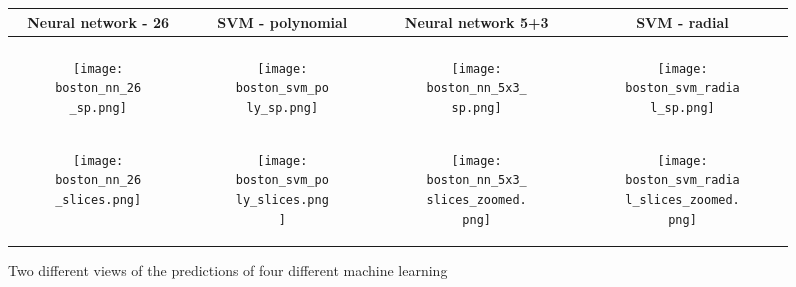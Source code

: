 \begin{figure*}[t]
  \centering
  \begin{tabular}[b]{cccc}
    Neural network - 26 & SVM - polynomial & Neural network 5+3 & SVM - radial \\
    \hline \\
    \begin{subfigure}[b]{0.2\textwidth}
      \texttt{[image: boston\_nn\_26\_sp.png]}
      \caption{
      }
      \label{fig:nn_comp:a}
    \end{subfigure}
    &
    \begin{subfigure}[b]{0.2\textwidth}
      \texttt{[image: boston\_svm\_poly\_sp.png]}
      \caption{
      }
      \label{fig:nn_comp:b}
    \end{subfigure}
    &
    \begin{subfigure}[b]{0.2\textwidth}
      \texttt{[image: boston\_nn\_5x3\_sp.png]}
      \caption{
      }
      \label{fig:nn_comp:c}
    \end{subfigure}
    &
    \begin{subfigure}[b]{0.2\textwidth}
      \texttt{[image: boston\_svm\_radial\_sp.png]}
      \caption{
      }
      \label{fig:nn_comp:d}
    \end{subfigure} \\
    \begin{subfigure}[b]{0.2\textwidth}
      \texttt{[image: boston\_nn\_26\_slices.png]}
      \caption{
      }
      \label{fig:nn_slices:e}
    \end{subfigure}
    &
    \begin{subfigure}[b]{0.2\textwidth}
      \texttt{[image: boston\_svm\_poly\_slices.png]}
      \caption{
      }
      \label{fig:nn_slices:f}
    \end{subfigure}
    &
    \begin{subfigure}[b]{0.2\textwidth}
      \texttt{[image: boston\_nn\_5x3\_slices\_zoomed.png]}
      \caption{
      }
      \label{fig:nn_slices:g}
    \end{subfigure}
    &
    \begin{subfigure}[b]{0.2\textwidth}
      \texttt{[image: boston\_svm\_radial\_slices\_zoomed.png]}
      \caption{
      }
      \label{fig:nn_slices:h}
    \end{subfigure}
  \end{tabular}
  \caption{
    Two different views of the predictions of four different machine learning
}
\end{figure*}
